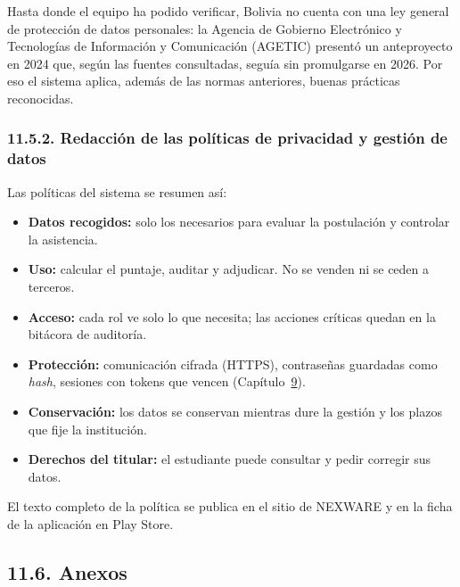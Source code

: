 Hasta donde el equipo ha podido verificar, Bolivia no cuenta con una ley general de protección de datos personales: la Agencia de Gobierno Electrónico y Tecnologías de Información y Comunicación (AGETIC) presentó un anteproyecto en 2024 que, según las fuentes consultadas, seguía sin promulgarse en 2026. Por eso el sistema aplica, además de las normas anteriores, buenas prácticas reconocidas.


\subsubsection{11.5.2. Redacción de las políticas de privacidad y gestión de datos}

Las políticas del sistema se resumen así:

\begin{itemize}
    \item \textbf{Datos recogidos:} solo los necesarios para evaluar la postulación y controlar la asistencia.
    \item \textbf{Uso:} calcular el puntaje, auditar y adjudicar. No se venden ni se ceden a terceros.
    \item \textbf{Acceso:} cada rol ve solo lo que necesita; las acciones críticas quedan en la bitácora de auditoría.
    \item \textbf{Protección:} comunicación cifrada (HTTPS), contraseñas guardadas como \textit{hash}, sesiones con tokens que vencen (Capítulo~\hyperref[cap:pruebas]{9}).
    \item \textbf{Conservación:} los datos se conservan mientras dure la gestión y los plazos que fije la institución.
    \item \textbf{Derechos del titular:} el estudiante puede consultar y pedir corregir sus datos.
\end{itemize}

El texto completo de la política se publica en el sitio de NEXWARE y en la ficha de la aplicación en Play Store.

\subsection{11.6. Anexos}

